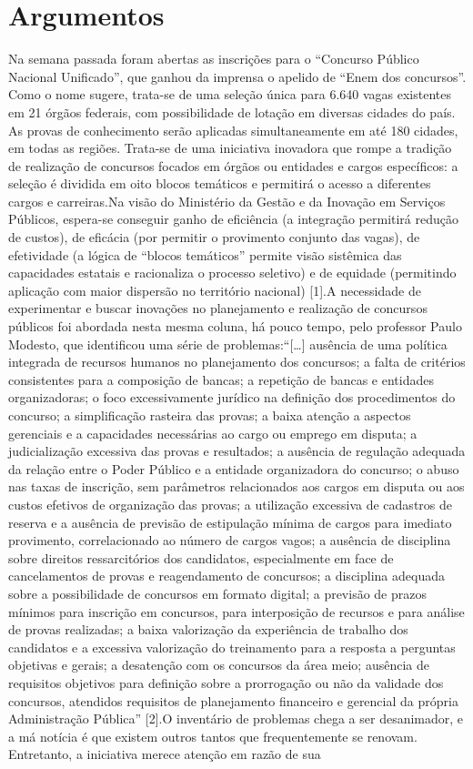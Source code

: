 \documentclass[
   article,       
   12pt,          
   oneside,       
   a4paper,       
   english,       
   brazil,        
   sumario=tradicional
   ]{abntex2}
\begin{document}
\section{Argumentos}
Na semana passada foram abertas as inscrições para o “Concurso Público Nacional Unificado”, que ganhou da imprensa o apelido de “Enem dos concursos”. Como o nome sugere, trata-se de uma seleção única para 6.640 vagas existentes em 21 órgãos federais, com possibilidade de lotação em diversas cidades do país. As provas de conhecimento serão aplicadas simultaneamente em até 180 cidades, em todas as regiões. Trata-se de uma iniciativa inovadora que rompe a tradição de realização de concursos focados em órgãos ou entidades e cargos específicos: a seleção é dividida em oito blocos temáticos e permitirá o acesso a diferentes cargos e carreiras.Na visão do Ministério da Gestão e da Inovação em Serviços Públicos, espera-se conseguir ganho de eficiência (a integração permitirá redução de custos), de eficácia (por permitir o provimento conjunto das vagas), de efetividade (a lógica de “blocos temáticos” permite visão sistêmica das capacidades estatais e racionaliza o processo seletivo) e de equidade (permitindo aplicação com maior dispersão no território nacional) [1].A necessidade de experimentar e buscar inovações no planejamento e realização de concursos públicos foi abordada nesta mesma coluna, há pouco tempo, pelo professor Paulo Modesto, que identificou uma série de problemas:“[…] ausência de uma política integrada de recursos humanos no planejamento dos concursos; a falta de critérios consistentes para a composição de bancas; a repetição de bancas e entidades organizadoras; o foco excessivamente jurídico na definição dos procedimentos do concurso; a simplificação rasteira das provas; a baixa atenção a aspectos gerenciais e a capacidades necessárias ao cargo ou emprego em disputa; a judicialização excessiva das provas e resultados; a ausência de regulação adequada da relação entre o Poder Público e a entidade organizadora do concurso; o abuso nas taxas de inscrição, sem parâmetros relacionados aos cargos em disputa ou aos custos efetivos de organização das provas; a utilização excessiva de cadastros de reserva e a ausência de previsão de estipulação mínima de cargos para imediato provimento, correlacionado ao número de cargos vagos; a ausência de disciplina sobre direitos ressarcitórios dos candidatos, especialmente em face de cancelamentos de provas e reagendamento de concursos; a disciplina adequada sobre a possibilidade de concursos em formato digital; a previsão de prazos mínimos para inscrição em concursos, para interposição de recursos e para análise de provas realizadas; a baixa valorização da experiência de trabalho dos candidatos e a excessiva valorização do treinamento para a resposta a perguntas objetivas e gerais; a desatenção com os concursos da área meio; ausência de requisitos objetivos para definição sobre a prorrogação ou não da validade dos concursos, atendidos requisitos de planejamento financeiro e gerencial da própria Administração Pública” [2].O inventário de problemas chega a ser desanimador, e a má notícia é que existem outros tantos que frequentemente se renovam. Entretanto, a iniciativa merece atenção em razão de sua 
\end{document}
